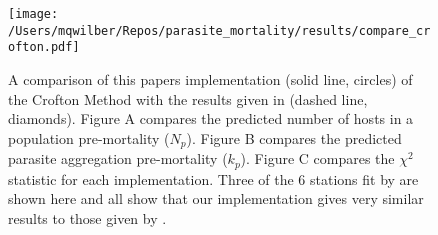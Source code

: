 \documentclass[12pt, a4paper]{article}
\begin{document}
\begin{figure}
    \centering
    \texttt{[image: /Users/mqwilber/Repos/parasite\_mortality/results/compare\_crofton.pdf]}
    \caption{A comparison of this papers implementation (solid line, circles) of the Crofton Method with the results given in \cite{Crofton1971a} (dashed line, diamonds).  Figure A compares the predicted number of hosts in a population pre-mortality ($N_p$). Figure B compares the predicted parasite aggregation pre-mortality ($k_p$).  Figure C compares the $\chi^2$ statistic for each implementation.  Three of the 6 stations fit by \citeauthor{Crofton1971a} are shown here and all show that our implementation gives very similar results to those given by \citeauthor{Crofton1971a}.}
    \label{fig:crof_test}

\end{figure}
\end{document}
